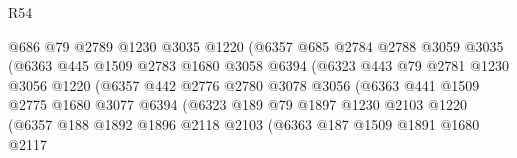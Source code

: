 \begin{lexlean}{R54}
\begin{coremodule}
                                @686
                                @79
                                @2789
                                @1230
                                @3035
                                @1220
                                (@6357
                                  @685
                                  @2784
                                  @2788
                                  @3059
                                  @3035
                                  (@6363
                                    @445
                                    @1509
                                    @2783
                                    @1680
                                    @3058
                                    @6394
                                    (@6323
                                      @443
                                      @79
                                      @2781
                                      @1230
                                      @3056
                                      @1220
                                      (@6357
                                        @442
                                        @2776
                                        @2780
                                        @3078
                                        @3056
                                        (@6363
                                          @441
                                          @1509
                                          @2775
                                          @1680
                                          @3077
                                          @6394
                                          (@6323
                                            @189
                                            @79
                                            @1897
                                            @1230
                                            @2103
                                            @1220
                                            (@6357
                                              @188
                                              @1892
                                              @1896
                                              @2118
                                              @2103
                                              (@6363
                                                @187
                                                @1509
                                                @1891
                                                @1680
                                                @2117

\end{coremodule}
\end{lexlean}
